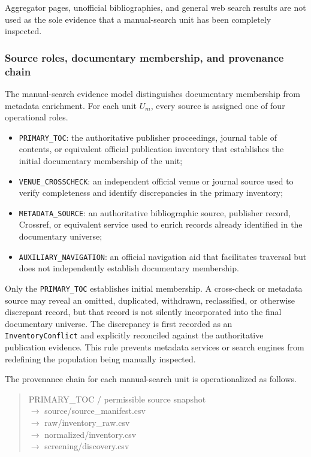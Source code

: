 Aggregator pages, unofficial bibliographies, and general web search results are not used as the
sole evidence that a manual-search unit has been completely inspected.


\subsubsection{Source roles, documentary membership, and provenance chain}

The manual-search evidence model distinguishes documentary membership from metadata enrichment.
For each unit \(U_m\), every source is assigned one of four operational roles.

\begin{itemize}
    \item \texttt{PRIMARY\_TOC}: the authoritative publisher proceedings, journal table of contents,
    or equivalent official publication inventory that establishes the initial documentary
    membership of the unit;
    \item \texttt{VENUE\_CROSSCHECK}: an independent official venue or journal source used to verify
    completeness and identify discrepancies in the primary inventory;
    \item \texttt{METADATA\_SOURCE}: an authoritative bibliographic source, publisher record, Crossref,
    or equivalent service used to enrich records already identified in the documentary universe;
    \item \texttt{AUXILIARY\_NAVIGATION}: an official navigation aid that facilitates traversal but
    does not independently establish documentary membership.
\end{itemize}

Only the \texttt{PRIMARY\_TOC} establishes initial membership. A cross-check or metadata source may
reveal an omitted, duplicated, withdrawn, reclassified, or otherwise discrepant record, but that
record is not silently incorporated into the final documentary universe. The discrepancy is first
recorded as an \texttt{InventoryConflict} and explicitly reconciled against the authoritative
publication evidence. This rule prevents metadata services or search engines from redefining the
population being manually inspected.

The provenance chain for each manual-search unit is operationalized as follows.

\begin{quote}
\begin{minipage}{0.94\textwidth}
\small\ttfamily\raggedright
PRIMARY\_TOC / permissible source snapshot\\
\(\rightarrow\) source/source\_manifest.csv\\
\(\rightarrow\) raw/inventory\_raw.csv\\
\(\rightarrow\) normalized/inventory.csv\\
\(\rightarrow\) screening/discovery.csv
\end{minipage}
\end{quote}

